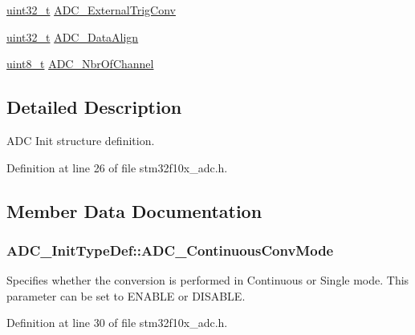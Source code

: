 \begin{DoxyCompactItemize}
\item 
\hyperlink{_p_e___types_8h_a33594304e786b158f3fb30289278f5af}{uint32\+\_\+t} \hyperlink{struct_a_d_c___init_type_def_ae5d0c48e70c2a39355b7ab0cc1df8310}{A\+D\+C\+\_\+\+External\+Trig\+Conv}
\item 
\hyperlink{_p_e___types_8h_a33594304e786b158f3fb30289278f5af}{uint32\+\_\+t} \hyperlink{struct_a_d_c___init_type_def_a622e89d8fba3900f20aaf40d5560ab7b}{A\+D\+C\+\_\+\+Data\+Align}
\item 
\hyperlink{_p_e___types_8h_aba7bc1797add20fe3efdf37ced1182c5}{uint8\+\_\+t} \hyperlink{struct_a_d_c___init_type_def_ad6f39a12ac32a2767085ac94e9338bc3}{A\+D\+C\+\_\+\+Nbr\+Of\+Channel}
\end{DoxyCompactItemize}


\subsection{Detailed Description}
A\+DC Init structure definition. 

Definition at line 26 of file stm32f10x\+\_\+adc.\+h.



\subsection{Member Data Documentation}
\subsubsection[{\texorpdfstring{A\+D\+C\+\_\+\+Continuous\+Conv\+Mode}{ADC_ContinuousConvMode}}]{ A\+D\+C\+\_\+\+Init\+Type\+Def\+::\+A\+D\+C\+\_\+\+Continuous\+Conv\+Mode}\hypertarget{struct_a_d_c___init_type_def_a2149036a332281e70a36879a2396b8d1}{}\label{struct_a_d_c___init_type_def_a2149036a332281e70a36879a2396b8d1}
Specifies whether the conversion is performed in Continuous or Single mode. This parameter can be set to E\+N\+A\+B\+LE or D\+I\+S\+A\+B\+LE. 

Definition at line 30 of file stm32f10x\+\_\+adc.\+h.

